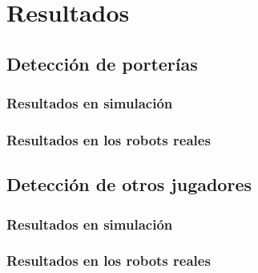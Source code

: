 \chapter{Resultados}
\section{Detección de porterías}
    \subsection{Resultados en simulación}
    \subsection{Resultados en los robots reales}
\section{Detección de otros jugadores}
    \subsection{Resultados en simulación}
    \subsection{Resultados en los robots reales}
